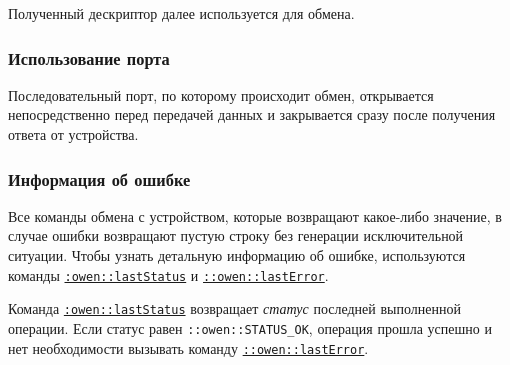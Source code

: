 \documentclass[12pt, a4paper]{article}
\newcommand{\CMD}[1]{{\tt \hyperref[#1]{#1}}}
\begin{document}
Полученный дескриптор далее используется для обмена.

\subsubsection{Использование порта}

Последовательный порт, по которому происходит обмен, открывается непосредственно перед передачей данных и закрывается сразу после получения ответа от устройства.

\subsubsection{Информация об ошибке}

Все команды обмена с устройством, которые возвращают какое-либо значение, в случае ошибки возвращают пустую строку без генерации исключительной ситуации. Чтобы узнать детальную информацию об ошибке, используются команды \CMD{:owen::lastStatus} и \CMD{::owen::lastError}.

Команда \CMD{:owen::lastStatus} возвращает {\it статус} последней выполненной операции. Если статус равен {\tt ::owen::STATUS\_OK}, операция прошла успешно и нет необходимости вызывать команду \CMD{::owen::lastError}.
\end{document}
